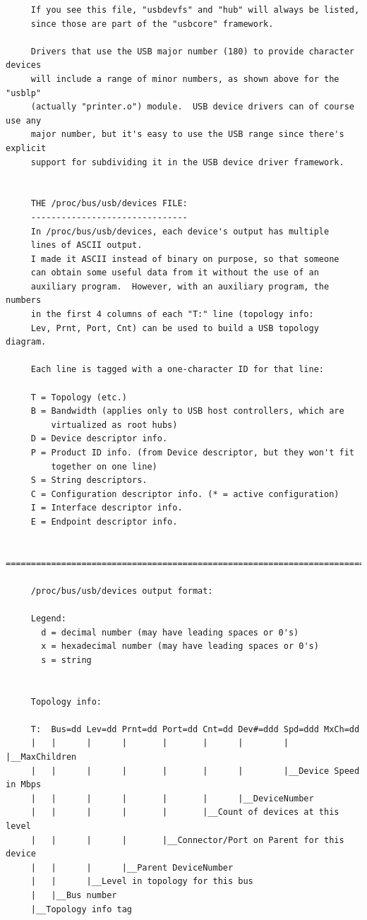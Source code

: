 {{{{{{{{{{{{{{{{{\begin{verbatim}
     If you see this file, "usbdevfs" and "hub" will always be listed,
     since those are part of the "usbcore" framework.
     
     Drivers that use the USB major number (180) to provide character devices
     will include a range of minor numbers, as shown above for the "usblp"
     (actually "printer.o") module.  USB device drivers can of course use any
     major number, but it's easy to use the USB range since there's explicit
     support for subdividing it in the USB device driver framework.
     
     
     THE /proc/bus/usb/devices FILE:
     -------------------------------
     In /proc/bus/usb/devices, each device's output has multiple
     lines of ASCII output.
     I made it ASCII instead of binary on purpose, so that someone
     can obtain some useful data from it without the use of an
     auxiliary program.  However, with an auxiliary program, the numbers
     in the first 4 columns of each "T:" line (topology info:
     Lev, Prnt, Port, Cnt) can be used to build a USB topology diagram.
     
     Each line is tagged with a one-character ID for that line:
     
     T = Topology (etc.)
     B = Bandwidth (applies only to USB host controllers, which are
         virtualized as root hubs)
     D = Device descriptor info.
     P = Product ID info. (from Device descriptor, but they won't fit
         together on one line)
     S = String descriptors.
     C = Configuration descriptor info. (* = active configuration)
     I = Interface descriptor info.
     E = Endpoint descriptor info.
     
     =======================================================================
     
     /proc/bus/usb/devices output format:
     
     Legend:
       d = decimal number (may have leading spaces or 0's)
       x = hexadecimal number (may have leading spaces or 0's)
       s = string
     
     
     Topology info:
     
     T:  Bus=dd Lev=dd Prnt=dd Port=dd Cnt=dd Dev#=ddd Spd=ddd MxCh=dd
     |   |      |      |       |       |      |        |       |__MaxChildren
     |   |      |      |       |       |      |        |__Device Speed in Mbps
     |   |      |      |       |       |      |__DeviceNumber
     |   |      |      |       |       |__Count of devices at this level
     |   |      |      |       |__Connector/Port on Parent for this device
     |   |      |      |__Parent DeviceNumber
     |   |      |__Level in topology for this bus
     |   |__Bus number
     |__Topology info tag
     

\end{verbatim}}}}}}}}}}}}}}}}}}
